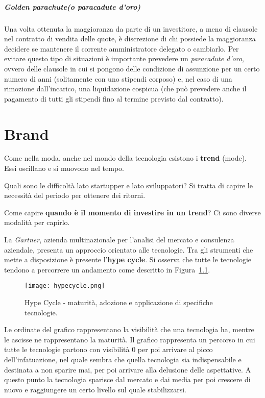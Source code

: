 \paragraph{Golden parachute(o paracadute d'oro)}
Una volta ottenuta la maggioranza da parte di un investitore, a meno di
clausole nel contratto di vendita delle quote, è discrezione di chi possiede la
maggioranza decidere se mantenere il corrente amministratore delegato o
cambiarlo. Per evitare questo tipo di situazioni è importante prevedere un
\textit{paracadute d'oro}, ovvero delle clausole in cui si pongono delle
condizione di assunzione per un certo numero di anni (solitamente con uno
stipendi corposo) e, nel caso di una rimozione dall'incarico, una liquidazione
cospicua (che può prevedere anche il pagamento di tutti gli stipendi fino al
termine previsto dal contratto).

\chapter{Brand}

Come nella moda, anche nel mondo della tecnologia esistono i \textbf{trend}
(mode). Essi oscillano e si muovono nel tempo.

Quali sono le difficoltà lato startupper e lato sviluppatori? Si tratta di
capire le necessità del periodo per ottenere dei ritorni.

Come capire \textbf{quando è il momento di investire in un trend}?
Ci sono diverse modalità per capirlo.

La \textit{Gartner}, azienda multinazionale per l'analisi del mercato e
consulenza aziendale, presenta un approccio orientato alle tecnologie. Tra gli
strumenti che mette a disposizione è presente l'\textbf{hype cycle}.
Si osserva che tutte le tecnologie tendono a percorrere un andamento come
descritto in Figura~\ref{fig:hypecycle}.

\begin{figure}[H]
\centering
\texttt{[image: hypecycle.png]}
\caption[Grafico Hype Cycle]{Hype Cycle - maturità, adozione e applicazione di
specifiche tecnologie.}
\label{fig:hypecycle}
\end{figure}

Le ordinate del grafico rappresentano la visibilità che una tecnologia ha,
mentre le ascisse ne rappresentano la maturità.
Il grafico rappresenta un percorso in cui tutte le tecnologie partono con
visibilità 0 per poi arrivare al picco dell'infatuazione, nel quale sembra che
quella tecnologia sia indispensabile e destinata a non sparire mai,
per poi arrivare alla delusione delle aspettative.
A questo punto la tecnologia sparisce dal mercato e dai media per poi crescere
di nuovo e raggiungere un certo livello sul quale stabilizzarsi.


